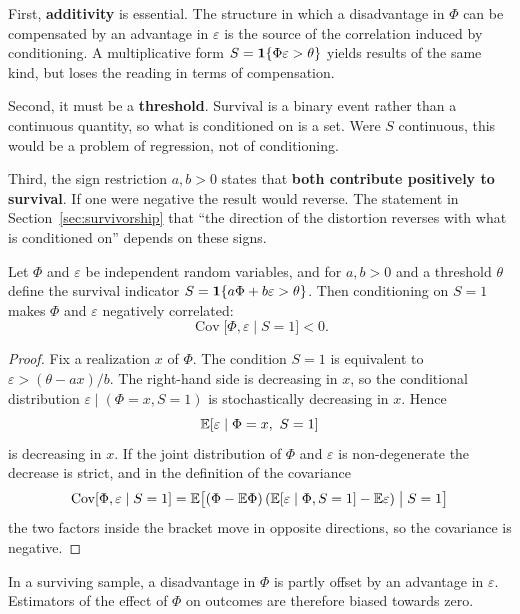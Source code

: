 First, \textbf{additivity} is essential. The structure in which a disadvantage in $\Phi$ can be
compensated by an advantage in $\varepsilon$ is the source of the correlation induced by
conditioning. A multiplicative form $S=\mathbf{1}\{\Phi\varepsilon>\theta\}$ yields results of the same
kind, but loses the reading in terms of compensation.

Second, it must be a \textbf{threshold}. Survival is a binary event rather than a continuous
quantity, so what is conditioned on is a set. Were $S$ continuous, this would be a problem of
regression, not of conditioning.

Third, the sign restriction $a,b>0$ states that \textbf{both contribute positively to survival}.
If one were negative the result would reverse. The statement in
Section~\ref{sec:survivorship} that ``the direction of the distortion reverses with what is
conditioned on'' depends on these signs.

\begin{proposition}
\label{prop:collider}
Let $\Phi$ and $\varepsilon$ be independent random variables, and for $a,b>0$ and a threshold
$\theta$ define the survival indicator $S = \mathbf{1}\{a\Phi + b\varepsilon > \theta\}$.
Then conditioning on $S=1$ makes $\Phi$ and $\varepsilon$ negatively correlated:
\[
\operatorname{Cov}\bigl[\Phi,\varepsilon \mid S=1\bigr] < 0 .
\]
\end{proposition}

\begin{proof}
Fix a realization $x$ of $\Phi$. The condition $S=1$ is equivalent to
$\varepsilon > (\theta - a x)/b$. The right-hand side is decreasing in $x$, so the conditional
distribution $\varepsilon \mid (\Phi=x, S=1)$ is stochastically decreasing in $x$. Hence
\[
\E[\varepsilon \mid \Phi=x,\ S=1]
\]
is decreasing in $x$. If the joint distribution of $\Phi$ and $\varepsilon$ is non-degenerate the
decrease is strict, and in the definition of the covariance
\[
\operatorname{Cov}[\Phi,\varepsilon\mid S=1]
= \mathbb{E}\bigl[(\Phi-\mathbb{E}\Phi)\,(\mathbb{E}[\varepsilon\mid\Phi,S=1]-\mathbb{E}\varepsilon)\bigm| S=1\bigr]
\]
the two factors inside the bracket move in opposite directions, so the covariance is negative.
\end{proof}

\begin{corollary}
In a surviving sample, a disadvantage in $\Phi$ is partly offset by an advantage in
$\varepsilon$. Estimators of the effect of $\Phi$ on outcomes are therefore biased towards zero.
\end{corollary}

